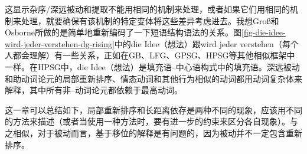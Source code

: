\zl
这显示杂序/深远被动和提取不能用相同的机制来处理，或者如果它们用相同的机制来处理，就要确保有该机制的特定变体将这些差异考虑进去。我想Groß和Osborne所做的是简单地重新编码了一下短语结构语法的关系。图\ref{fig-die-idee-wird-jeder-verstehen-dg-rising}中的die Idee（想法）跟wird jeder verstehen（每个人都会理解）有一些关系，正如在GB、LFG、GPSG、HPSG等其他相似框架中一样。在HPSG中，die Idee（想法）是填充语--中心语构式中的填充语。深远被动和助动词论元的局部重新排序、情态动词和其他行为相似的动词都用动词复杂体来解释，其中所有非--动词论元都依赖于最高动词\citep{HN94a}。

这一章可以总结如下，局部重新排序和长距离依存是两种不同的现象，应该用不同的方法来描述（或者当使用一种方法时，要有进一步的约束来区分各自现象）。与之相似，对于被动而言，基于移位的解释是有问题的，因为被动并不一定包含重新排序。


